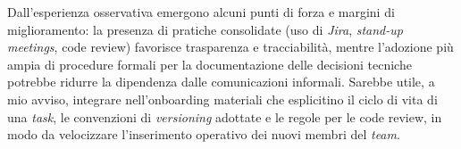 Dall’esperienza osservativa emergono alcuni punti di forza e margini di miglioramento: la presenza di pratiche consolidate (uso di \emph{Jira}, \emph{stand-up meetings}, code review) 
favorisce trasparenza e tracciabilità, mentre l’adozione più ampia di procedure formali per la documentazione delle decisioni tecniche potrebbe ridurre la dipendenza dalle comunicazioni informali. 
Sarebbe utile, a mio avviso, integrare nell’onboarding materiali che esplicitino il ciclo di vita di una \emph{task}, le convenzioni di \emph{versioning} adottate e le regole per le code review, 
in modo da velocizzare l’inserimento operativo dei nuovi membri del \emph{team}.



